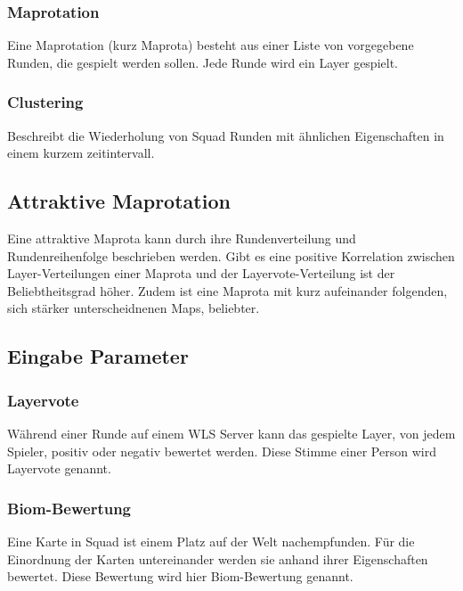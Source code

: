 \documentclass[a4paper, 11pt]{scrreprt}
\begin{document}
            \subsubsection{Maprotation}
                Eine Maprotation (kurz Maprota) besteht aus einer Liste von vorgegebene Runden, die gespielt werden sollen.
                Jede Runde wird ein Layer gespielt.
            \subsubsection{Clustering}
                Beschreibt die Wiederholung von Squad Runden mit ähnlichen Eigenschaften in einem kurzem zeitintervall.
            \subsection{Attraktive Maprotation}
                Eine attraktive Maprota kann durch ihre Rundenverteilung und Rundenreihenfolge beschrieben werden.
                Gibt es eine positive Korrelation zwischen Layer-Verteilungen einer Maprota und der Layervote-Verteilung ist der Beliebtheitsgrad höher.
                Zudem ist eine Maprota mit kurz aufeinander folgenden, sich stärker unterscheidnenen Maps, beliebter.
        \subsection{Eingabe Parameter}
            \subsubsection{Layervote}
                Während einer Runde auf einem \ac{WLS} Server kann das gespielte Layer, von jedem Spieler,
                positiv oder negativ bewertet werden.
                Diese Stimme einer Person wird Layervote genannt.
            \subsubsection{Biom-Bewertung}
                Eine Karte in Squad ist einem Platz auf der Welt nachempfunden. 
                Für die Einordnung der Karten untereinander werden sie anhand ihrer Eigenschaften bewertet.
                Diese Bewertung wird hier Biom-Bewertung genannt.
\end{document}
